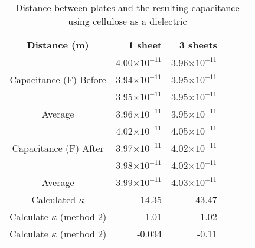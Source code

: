 \documentclass [12pt, letterpaper, twoside] {article}
\begin{document}
\begin{table}[h!]
  \centering
  \begin{tabular}{| c | r | r | r | r | r |}
    \hline\hline
    Distance (m) & 1 sheet & 3 sheets \\
    \hline
    \multirow {3}{*}{Capacitance (F) Before} & 4.00\(\times10^{-11}\) & 3.96\(\times10^{-11}\) \\
    & 3.94\(\times10^{-11}\) & 3.95\(\times10^{-11}\) \\
    & 3.95\(\times10^{-11}\) & 3.95\(\times10^{-11}\) \\
    \hline
    Average & 3.96\(\times10^{-11}\) & 3.95\(\times10^{-11}\) \\ %
    \hline
    \multirow {3}{*}{Capacitance (F) After} & 4.02\(\times10^{-11}\) & 4.05\(\times10^{-11}\) \\
    & 3.97\(\times10^{-11}\) & 4.02\(\times10^{-11}\) \\
    & 3.98\(\times10^{-11}\) & 4.02\(\times10^{-11}\) \\
    \hline
    Average & 3.99\(\times10^{-11}\) & 4.03\(\times10^{-11}\) \\
    \hline
    Calculated \(\kappa\) & 14.35 & 43.47 \\ %
    \hline
    Calculate \(\kappa\) (method 2) & 1.01 & 1.02 \\ %
    \hline
    Calculate \(\kappa\) (method 2) & -0.034 & -0.11 \\ %
    \hline\hline
  \end{tabular}
  \caption{Distance between plates and the resulting capacitance using cellulose as a dielectric}
\end{table}
\end{document}
